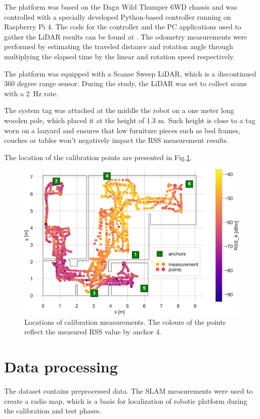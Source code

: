 \documentclass[conference]{IEEEtran}
\begin{document}
The platform was based on the Dagu Wild Thumper 6WD chassis and was controlled with a specially developed Python-based controller running on Raspberry Pi 4. The code for the controller and the PC applications used to gather the LiDAR results can be found at \cite{b2}.  The odometry measurements were performed by estimating the traveled distance and rotation angle through multiplying the elapsed time by the linear and rotation speed respectively.

The platform was equipped with a Scanse Sweep LiDAR, which is a discontinued 360 degree range sensor. During the study, the LiDAR was set to collect scans with a 2~Hz rate.

The system tag was attached at the middle the robot on a one meter long wooden pole, which placed it at the height of 1.3 m. Such height is close to a tag worn on a lanyard and ensures that low furniture pieces such as bed frames, couches or tables won't negatively impact the RSS measurement results.

The location of the calibration points are presented in Fig.\ref{fig:calibration}.

\begin{figure}[h]
\centering
\includegraphics[width=\columnwidth]{figs/measurement_points}
\caption{\label{fig:calibration}Locations of calibration measurements. The colours of the points reflect the measured RSS value by anchor 4.}
\end{figure}

\section{Data processing}
The dataset contains preprocessed data. The SLAM measurements were used to create a radio map, which is a basis for localization of robotic platform during the calibration and test phases.
\end{document}
